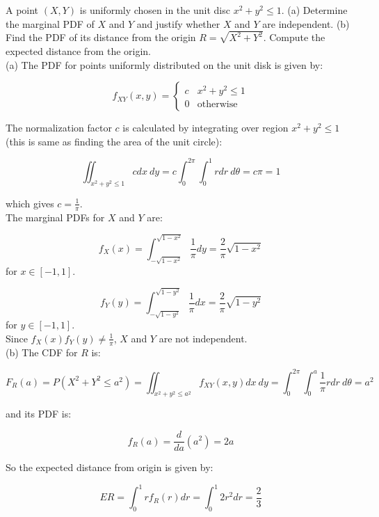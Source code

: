 \begin{texample}
	A point $(X,Y)$ is uniformly chosen in the unit disc $x^2+y^2\leq 1$. (a) Determine the marginal PDF of $X$ and $Y$ and justify whether $X$ and $Y$ are independent. (b) Find the PDF of its distance from the origin $R = \sqrt{X^2+Y^2}$. Compute the expected distance from the origin. \\
	
	(a) The PDF for points uniformly distributed on the unit disk is given by:
	
	$$
	f_{XY}(x,y)=\begin{cases}
		c & x^2+y^2\leq 1 \\
		0 & \text{otherwise}
	\end{cases}
	$$
	
	The normalization factor $c$ is calculated by integrating over region $x^2+y^2\leq 1$ (this is same as finding the area of the unit circle):
	
	\[\iint_{x^2+y^2\leq 1} c dx\:dy = c\int_0^{2\pi}\int_0^1 rdr\:d\theta=c\pi=1 \]
	
	which gives $c=\frac{1}{\pi}$. \\
	
	The marginal PDFs for $X$ and $Y$ are:
	
	\[f_X(x)=\int_{-\sqrt{1-x^2}}^{\sqrt{1-x^2}} \frac{1}{\pi} dy = \frac{2}{\pi} \sqrt{1-x^2} \] for $x\in[-1,1]$.
	
	\[f_Y(y)=\int_{-\sqrt{1-y^2}}^{\sqrt{1-y^2}} \frac{1}{\pi} dx = \frac{2}{\pi} \sqrt{1-y^2} \] for $y\in[-1,1]$. \\
	
	Since $f_X(x)f_Y(y)\ne\frac{1}{\pi}$, $X$ and $Y$ are not independent. \\
	
	(b) The CDF for $R$ is:
	
	\[F_R(a)=P(X^2+Y^2\le a^2)=\iint_{x^2+y^2\leq a^2} f_{XY}(x,y) dx\:dy=\int_0^{2\pi}\int_0^a \frac{1}{\pi} rdr\:d\theta=a^2\]
	
	and its PDF is:
	
	\[f_R(a)=\frac{d}{da}(a^2)=2a\]
	
	So the expected distance from origin is given by:
	
	\[ER=\int_0^1 rf_R(r)dr=\int_0^1 2r^2dr=\frac23\]
\end{texample}

